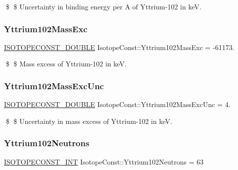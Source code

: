 \$ \$ Uncertainty in binding energy per A of Yttrium-\/102 in keV. \mbox{\label{group___isotope_const-_yttrium-_y102_gab98bc9d63cbb586b6f76712653ae3baa}} 
\subsubsection{\texorpdfstring{Yttrium102\+Mass\+Exc}{Yttrium102MassExc}}
{\footnotesize\ttfamily \mbox{\hyperlink{group___isotope_const-_macros_ga8f45a7272ce02c0b4c65c44636ed719a}{I\+S\+O\+T\+O\+P\+E\+C\+O\+N\+S\+T\+\_\+\+D\+O\+U\+B\+LE}} Isotope\+Const\+::\+Yttrium102\+Mass\+Exc = -\/61173.}

\$ \$ Mass excess of Yttrium-\/102 in keV. \mbox{\label{group___isotope_const-_yttrium-_y102_gae5c7a5955a3deb46264fe476ab7645ad}} 
\subsubsection{\texorpdfstring{Yttrium102\+Mass\+Exc\+Unc}{Yttrium102MassExcUnc}}
{\footnotesize\ttfamily \mbox{\hyperlink{group___isotope_const-_macros_ga8f45a7272ce02c0b4c65c44636ed719a}{I\+S\+O\+T\+O\+P\+E\+C\+O\+N\+S\+T\+\_\+\+D\+O\+U\+B\+LE}} Isotope\+Const\+::\+Yttrium102\+Mass\+Exc\+Unc = 4.}

\$ \$ Uncertainty in mass excess of Yttrium-\/102 in keV. \mbox{\label{group___isotope_const-_yttrium-_y102_ga104cd89e91da59d334a689852b16f7c1}} 
\subsubsection{\texorpdfstring{Yttrium102\+Neutrons}{Yttrium102Neutrons}}
{\footnotesize\ttfamily \mbox{\hyperlink{group___isotope_const-_macros_ga5f18360b3e99483a35c32d789e62621c}{I\+S\+O\+T\+O\+P\+E\+C\+O\+N\+S\+T\+\_\+\+I\+NT}} Isotope\+Const\+::\+Yttrium102\+Neutrons = 63}

